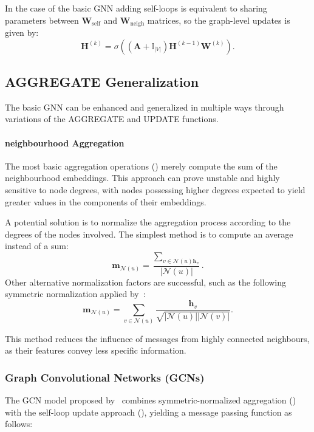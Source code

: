In the case of the basic GNN adding self-loops is equivalent to sharing parameters between $\mathbf{W}_\text{self}$ and $\mathbf{W}_\text{neigh}$ matrices, so the graph-level updates is given by:
\begin{equation}\label{eq:basicGNNgraphlevelselfLoop}
    \mathbf{H}^{(k)} = \sigma\left(\left(\mathbf{A} + \mathbb{I}_{|V|}\right)\mathbf{H}^{(k-1)}\mathbf{W}^{(k)}\right).
\end{equation}


\subsection{AGGREGATE Generalization}
The basic GNN can be enhanced and generalized in multiple ways through variations of the AGGREGATE and UPDATE functions.

\paragraph{neighbourhood Aggregation}
The most basic aggregation operations () merely compute the sum of the neighbourhood embeddings. This approach can prove unstable and highly sensitive to node degrees, with nodes possessing higher degrees expected to yield greater values in the components of their embeddings.

A potential solution is to normalize the aggregation process according to the degrees of the nodes involved. The simplest method is to compute an average instead of a sum:
\begin{equation*}
    \mathbf{m}_{\mathcal{N}(u)} = \frac{\sum_{v \in \mathcal{N}(u) \mathbf{h}_v}}{|\mathcal{N}(u)|}.
\end{equation*}
Other alternative normalization factors are successful, such as the following symmetric normalization applied by~\cite{kipf2016semi}:
\begin{equation}\label{eq:symmetricNormalization}
    \mathbf{m}_{\mathcal{N}(u)} = \sum_{v \in \mathcal{N}(u)}\frac{ \mathbf{h}_v}{\sqrt{|\mathcal{N}(u)||\mathcal{N}(v)|}}.
\end{equation}

This method reduces the influence of messages from highly connected neighbours, as their features convey less specific information.

\subsubsection{Graph Convolutional Networks (GCNs)}
The GCN model proposed by~\cite{kipf2016semi} combines symmetric-normalized aggregation () with the self-loop update approach (), yielding a message passing function as follows:


